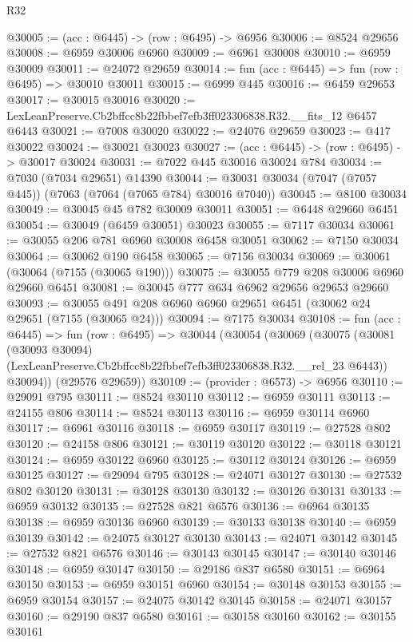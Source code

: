 \begin{lexlean}{R32}
\begin{coremodule}
@30005 := (acc : @6445) -> (row : @6495) -> @6956
@30006 := @8524 @29656
@30008 := @6959 @30006 @6960
@30009 := @6961 @30008
@30010 := @6959 @30009
@30011 := @24072 @29659
@30014 := fun (acc : @6445) => fun (row : @6495) => @30010 @30011
@30015 := @6999 @445
@30016 := @6459 @29653
@30017 := @30015 @30016
@30020 := LexLeanPreserve.Cb2bffcc8b22fbbef7efb3ff023306838.R32.__fits_12 @6457 @6443
@30021 := @7008 @30020
@30022 := @24076 @29659
@30023 := @417 @30022
@30024 := @30021 @30023
@30027 := (acc : @6445) -> (row : @6495) -> @30017 @30024
@30031 := @7022 @445 @30016 @30024 @784
@30034 := @7030 (@7034 @29651) @14390
@30044 := @30031 @30034 (@7047 (@7057 @445)) (@7063 (@7064 (@7065 @784) @30016 @7040))
@30045 := @8100 @30034
@30049 := @30045 @45 @782 @30009 @30011
@30051 := @6448 @29660 @6451
@30054 := @30049 (@6459 @30051) @30023
@30055 := @7117 @30034
@30061 := @30055 @206 @781 @6960 @30008 @6458 @30051
@30062 := @7150 @30034
@30064 := @30062 @190 @6458
@30065 := @7156 @30034
@30069 := @30061 (@30064 (@7155 (@30065 @190)))
@30075 := @30055 @779 @208 @30006 @6960 @29660 @6451
@30081 := @30045 @777 @634 @6962 @29656 @29653 @29660
@30093 := @30055 @491 @208 @6960 @6960 @29651 @6451 (@30062 @24 @29651 (@7155 (@30065 @24)))
@30094 := @7175 @30034
@30108 := fun (acc : @6445) =>
  fun (row : @6495) =>
  @30044
    (@30054
      (@30069
        (@30075
          (@30081
            (@30093 @30094)
            (LexLeanPreserve.Cb2bffcc8b22fbbef7efb3ff023306838.R32.__rel_23 @6443))
          @30094))
      (@29576 @29659))
@30109 := (provider : @6573) -> @6956
@30110 := @29091 @795
@30111 := @8524 @30110
@30112 := @6959 @30111
@30113 := @24155 @806
@30114 := @8524 @30113
@30116 := @6959 @30114 @6960
@30117 := @6961 @30116
@30118 := @6959 @30117
@30119 := @27528 @802
@30120 := @24158 @806
@30121 := @30119 @30120
@30122 := @30118 @30121
@30124 := @6959 @30122 @6960
@30125 := @30112 @30124
@30126 := @6959 @30125
@30127 := @29094 @795
@30128 := @24071 @30127
@30130 := @27532 @802 @30120
@30131 := @30128 @30130
@30132 := @30126 @30131
@30133 := @6959 @30132
@30135 := @27528 @821 @6576
@30136 := @6964 @30135
@30138 := @6959 @30136 @6960
@30139 := @30133 @30138
@30140 := @6959 @30139
@30142 := @24075 @30127 @30130
@30143 := @24071 @30142
@30145 := @27532 @821 @6576
@30146 := @30143 @30145
@30147 := @30140 @30146
@30148 := @6959 @30147
@30150 := @29186 @837 @6580
@30151 := @6964 @30150
@30153 := @6959 @30151 @6960
@30154 := @30148 @30153
@30155 := @6959 @30154
@30157 := @24075 @30142 @30145
@30158 := @24071 @30157
@30160 := @29190 @837 @6580
@30161 := @30158 @30160
@30162 := @30155 @30161

\end{coremodule}
\end{lexlean}
